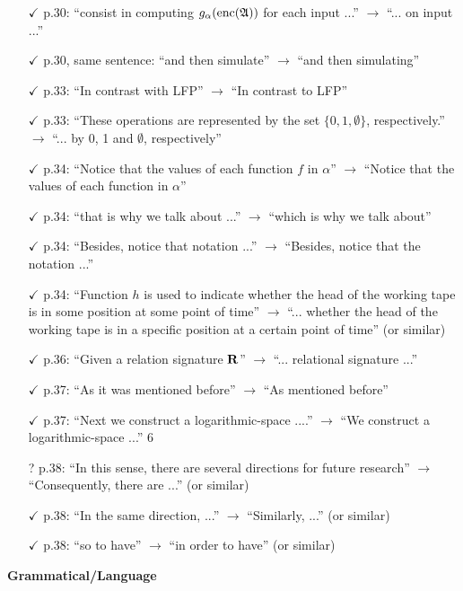 \begin{itemize}
	\item[$\checkmark$] p.30: ``consist in computing $g_{\alpha}({\rm enc}(\mathfrak{A}))$ for each input ...'' $\to$ ``... on input ...''
	\item[$\checkmark$] p.30, same sentence: ``and then simulate'' $\to$ ``and then simulating''
	\item[$\checkmark$] p.33: ``In contrast with LFP'' $\to$ ``In contrast to LFP''
	\item[$\checkmark$] p.33: ``These operations are represented by the set $\{0,1,\emptyset\}$, respectively.'' $\to$ ``... by 0, 1 and
	$\emptyset$, respectively''
	\item[$\checkmark$] p.34: ``Notice that the values of each function $f$ in $\alpha$'' $\to$ ``Notice that the values of each
	function in $\alpha$''
	\item[$\checkmark$] p.34: ``that is why we talk about ...'' $\to$ ``which is why we talk about''
	\item[$\checkmark$] p.34: ``Besides, notice that notation ...'' $\to$ ``Besides, notice that the notation ...''
	\item[$\checkmark$] p.34: ``Function $h$ is used to indicate whether the head of the working tape is in some position
	at some point of time'' $\to$ ``... whether the head of the working tape is in a specific position
	at a certain point of time'' (or similar)
	\item[$\checkmark$] p.36: ``Given a relation signature $\mathbf{R}$'' $\to$ ``... relational signature ...''
	\item[$\checkmark$] p.37: ``As it was mentioned before'' $\to$ ``As mentioned before''
	\item[$\checkmark$] p.37: ``Next we construct a logarithmic-space ....'' $\to$ ``We construct a logarithmic-space ...''
	6
	\item[?] p.38: ``In this sense, there are several directions for future research'' $\to$ ``Consequently, there
	are ...'' (or similar)
	\item[$\checkmark$] p.38: ``In the same direction, ...'' $\to$ ``Similarly, ...'' (or similar)
	\item[$\checkmark$] p.38: ``so to have'' $\to$ ``in order to have'' (or similar)
\end{itemize}
\vspace{1em}
{\bf Grammatical/Language}
